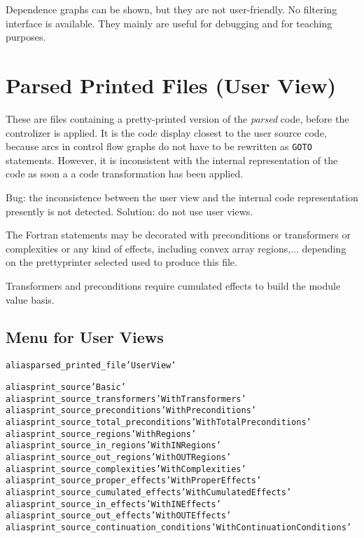 \documentclass[a4paper]{report}
\newenvironment{PipsMake}{\begin{alltt}}{\end{alltt}}
\newenvironment{PipsPass}[1]{\label{pass:#1}}{}
\begin{document}
Dependence graphs can be shown, but they are not user-friendly. No
filtering interface is available. They mainly are useful for debugging
and for teaching purposes.

\section{Parsed Printed Files (User View)}

\begin{PipsPass}{parsed_printed_file}
\label{sec:parsed_printed_files}
\label{subsection-parsed-printed-files}
These are files containing a pretty-printed version of the {\em parsed} code,
before the controlizer is applied. It is the code display closest to the
user source code, because arcs in control flow graphs do not have to be
rewritten as {\tt GOTO} statements. However, it is inconsistent with the
internal representation of the code as soon a a code transformation
has been applied.

Bug: the inconsistence between the user view and the internal code
representation presently is not detected. Solution: do not use user views.

The Fortran statements may be
decorated with preconditions or transformers or complexities or any kind
of effects, including convex array regions,... depending on the
prettyprinter selected used to produce this file.

Transformers and preconditions require cumulated effects to build the
module value basis.
\end{PipsPass}

\subsection{Menu for User Views}

\begin{PipsMake}
alias parsed_printed_file 'User View'

alias print_source 'Basic'
alias print_source_transformers 'With Transformers'
alias print_source_preconditions 'With Preconditions'
alias print_source_total_preconditions 'With Total Preconditions'
alias print_source_regions 'With Regions'
alias print_source_in_regions 'With IN Regions'
alias print_source_out_regions 'With OUT Regions'
alias print_source_complexities 'With Complexities'
alias print_source_proper_effects 'With Proper Effects'
alias print_source_cumulated_effects 'With Cumulated Effects'
alias print_source_in_effects 'With IN Effects'
alias print_source_out_effects 'With OUT Effects'
alias print_source_continuation_conditions 'With Continuation Conditions'
\end{PipsMake}
\end{document}
